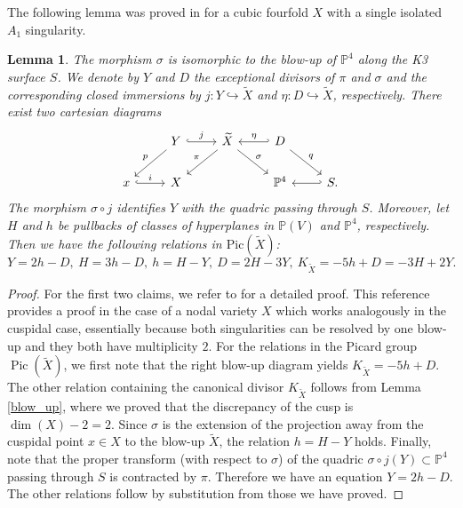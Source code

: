 \documentclass[a4paper, twoside, 11pt]{amsart}
\newtheorem{lemma}[theorem]{Lemma}
\theoremstyle{definition}
\theoremstyle{remark}
\numberwithin{equation}{theorem}
\DeclareMathOperator{\picard}{Pic}
\begin{document}
The following lemma was proved in \cite[Lemma 5.1]{dervied_cat_cubic_fourfold} for a cubic fourfold $X$ with a single isolated $A_1$ singularity. 
\begin{lemma}\label{associatedK3}
	The morphism $\sigma$ is isomorphic to the blow-up of $\mathbb{P}^4$ along the K3 surface $S$. We denote by $Y$ and $D$ the exceptional divisors of $\pi$ and $\sigma$ and the corresponding closed immersions by $j\colon Y \hookrightarrow \widetilde{X}$ and $\eta\colon D \hookrightarrow \widetilde{X}$, respectively. There exist two cartesian diagrams
	\begin{equation*}
		\begin{tikzcd}
			& Y \arrow[ld, "p"'] \arrow[r, hook, "j"] & \widetilde{X} \arrow[ld, "\pi"'] \arrow[rd, "\sigma"] & D \arrow[l, hook', "\eta"'] \arrow[rd, "q"] &             \\
			x \arrow[r, hook, "i"] & X                                &                                                       & \mathbb{P}^4                 & S. \arrow[l,hook']
		\end{tikzcd}
	\end{equation*}
The morphism $\sigma \circ j$ identifies $Y$ with the quadric passing through $S$. Moreover, let $H$ and $h$ be pullbacks of classes of hyperplanes in $\mathbb{P}(V)$ and $\mathbb{P}^4$, respectively. Then we have the following relations in $\text{Pic}(\widetilde{X})$:
\begin{equation*}
	Y = 2h - D, \ H=3h-D,\ h=H-Y, \ D=2H-3Y, \ K_{\widetilde{X}} = -5h +D = -3H +2Y.
\end{equation*}
\end{lemma}
\begin{proof}
	For the first two claims, we refer to \cite[Lemma 5.1]{dervied_cat_cubic_fourfold} for a detailed proof. This reference provides a proof in the case of a nodal variety $X$ which works analogously in the cuspidal case, essentially because both singularities can be resolved by one blow-up and they both have multiplicity $2$. For the relations in the Picard group $\picard(\widetilde{X})$, we first note that the right blow-up diagram yields $K_{\widetilde{X}} = -5h + D$. The other relation containing the canonical divisor $K_{\widetilde{X}}$ follows from Lemma \ref{blow_up}, where we proved that the discrepancy of the cusp is $\dim(X)-2=2$.
    Since $\sigma$ is the extension of the projection away from the cuspidal point $x \in X$ to the blow-up $\widetilde{X}$, the relation $h = H - Y$ holds.  
	Finally, note that the proper transform (with respect to $\sigma$) of the quadric $\sigma \circ j(Y) \subset \mathbb{P}^4$ passing through $S$ is contracted by $\pi$. Therefore we have an equation $Y = 2h-D$. The other relations follow by substitution from those we have proved.
\end{proof}
\end{document}
